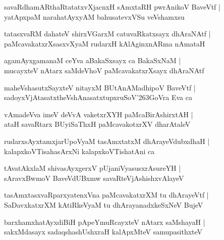\documentclass[twoside,12pt,openright]{book}
\def\S{\char'263}
\newcounter{shloka}[chapter]
\begin{document}
\begin{shloka}%
savaRdhamARthaRtatatxvXjacnxH sAmxtaRH pwrAnikoV BaveVtf |\\
yatApxpaM narahatAyxyAM bahusatevxVSu veVshamxsu
\end{shloka}

\begin{shloka}%
tatasxvaRM dahateV shirxVGarxM catuvaRkatxsayx dhAraNAtf |\\
paMcavakatxrXsasxvXyaM rudarxH kAlAginxnARma nAmataH 
\end{shloka}

\begin{shloka}%
agamAyxgamanaM ceYva aBakaSxsayx ca BakaSxNaM |\\
mucayxteV nAtarx saMdeVhoV paMcavakatxrXsayx dhAraNAtf 
\end{shloka}

\begin{shloka}%
maheVshasutxSayxteV nitayxM BUtAnAMadhipoV BaveVtf |\\
sadoyxVjAtasatxtheVshAnasatxtupxruSoV\S GoVra Eva ca
\end{shloka}

\begin{shloka}%
vAmadeVva imeV deVvA vaketxrXYH paMcaBirAshirxtAH |\\
ataH savaRtarx BUyiSaThxH paMcavakotxrXV dharAtaleV 
\end{shloka}

\begin{shloka}%
rudarxsAyxtamxjarUpoVyaM tasAmxtatxM dhArayeVdubxdhaH |\\
kalapxkoVTisahasArxNi kalapxkoVTishatAni ca 
\end{shloka}

\begin{shloka}%
tAvatAkxlaM shivasAyxgerxV pUjaniVyasusxrAsureYH |\\
sAravxBwmoV BaveVdUBxmw savaRteVjAshishxvAlayeV 
\end{shloka}

\begin{shloka}%
tasAmxtasxvaRparxyatenxVna paMcavakatxrXM tu dhArayeVtf |\\
SaDavxkatxrXM kAtiRkeVyaM tu dhArayanadxkeSxNeV BujeV 
\end{shloka}

\begin{shloka}%
barxhamxhatAyxdiBiH pApeYmuRcayxteV nAtarx saMshayaH |\\
sakxMdasayx sadaqshashUshxraH kalApxMteV samupasithxteV 
\end{shloka}
\end{document}
